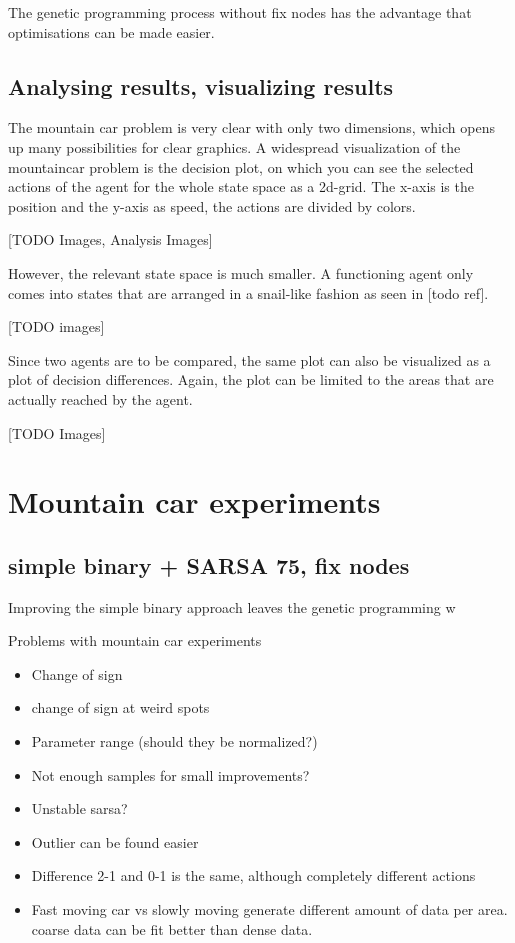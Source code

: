 The genetic programming process without fix nodes has the advantage that optimisations can be made easier.

\subsection{Analysing results, visualizing results}

The mountain car problem is very clear with only two dimensions, which opens up many possibilities for clear graphics.
A widespread visualization of the mountaincar problem is the decision plot, on which you can see the selected actions of the agent for the whole state space as a 2d-grid.
The x-axis is the position and the y-axis as speed, the actions are divided by colors.

[TODO Images, Analysis Images]

However, the relevant state space is much smaller. A functioning agent only comes into states that are arranged in a snail-like fashion as seen in [todo ref].

[TODO images]

Since two agents are to be compared, the same plot can also be visualized as a plot of decision differences. Again, the plot can be limited to the areas that are actually reached by the agent.

[TODO Images]

\section{Mountain car experiments}

\subsection{simple binary + SARSA 75, fix nodes}

Improving the simple binary approach leaves the genetic programming w











Problems with mountain car experiments
\begin{itemize}
    \item Change of sign
    \item change of sign at weird spots
    \item Parameter range (should they be normalized?)
    \item Not enough samples for small improvements?
    \item Unstable sarsa?
    \item Outlier can be found easier
    \item Difference 2-1 and 0-1 is the same, although completely different actions
    \item Fast moving car vs slowly moving generate different amount of data per area. coarse data can be fit better than dense data.
\end{itemize}